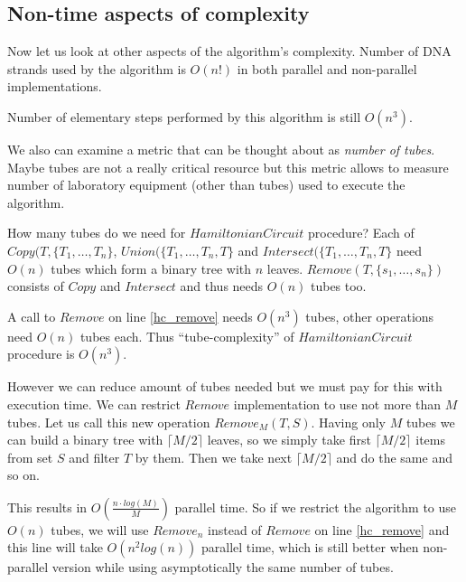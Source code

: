 \subsection{Non-time aspects of complexity}
Now let us look at other aspects of the algorithm's complexity. Number of DNA strands used by the algorithm is $O(n!)$ in both parallel and non-parallel implementations.

Number of elementary steps performed by this algorithm is still $O(n^3)$.

We also can examine a metric that can be thought about as \emph{number of tubes}. Maybe tubes are not a really critical resource but this metric allows to measure number of laboratory equipment (other than tubes) used to execute the algorithm. 

How many tubes do we need for $HamiltonianCircuit$ procedure? Each of $Copy(T, \{T_1, \dots, T_n\}$, $Union(\{T_1, \dots, T_n, T\}$ and $Intersect(\{T_1, \dots, T_n, T\}$ need $O(n)$ tubes which form a binary tree with $n$ leaves. $Remove(T, \{s_1, \dots, s_n\})$ consists of $Copy$ and $Intersect$ and thus needs $O(n)$ tubes too.

A call to $Remove$ on line \ref{hc_remove} needs $O(n^3)$ tubes, other operations need $O(n)$ tubes each. Thus ``tube-complexity'' of $HamiltonianCircuit$ procedure is $O(n^3)$. 

However we can reduce amount of tubes needed but we must pay for this with execution time. We can restrict $Remove$ implementation to use not more than $M$ tubes. Let us call this new operation $Remove_M(T, S)$. Having only $M$ tubes we can build a binary tree with $\lceil M/2 \rceil$ leaves, so we simply take first $\lceil M/2 \rceil$ items from set $S$ and filter $T$ by them. Then we take next $\lceil M/2 \rceil$ and do the same and so on.


This results in $O\left(\frac{n \cdot log(M)}{M}\right)$ parallel time. So if we restrict the algorithm to use $O(n)$ tubes, we will use $Remove_n$ instead of $Remove$ on line \ref{hc_remove} and this line will take $O( n^2 log(n))$ parallel time, which is still better when non-parallel version while using asymptotically the same number of tubes.